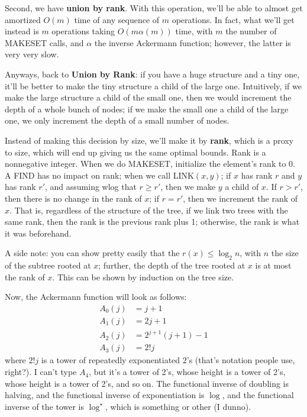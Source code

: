 \documentclass{article}
\begin{document}
Second, we have \textbf{union by rank}.
With this operation, we'll be able to almost get amortized $O(m)$ time of any
sequence of $m$ operations.
In fact, what we'll get instead is $m$ operations taking $O(m\alpha(m))$
time, with $m$ the number of MAKESET calls, and $\alpha$ the inverse 
Ackermann function; however, the latter is very very slow.

Anyways, back to \textbf{Union by Rank}: if you have a huge structure
and a tiny one, it'll be better to make the tiny structure
a child of the large one.
Intuitively, if we make the large structure a child of the small one, then
we would increment the depth of a whole bunch of nodes; if we make the
small one a child of the large one, we only increment the depth of a
small number of nodes.

Instead of making this decision by size, we'll make it by \textbf{rank}, which is a
proxy to size, which will end up giving us the same optimal bounds.
Rank is a nonnegative integer.
When we do MAKESET, initialize the element's rank to 0.
A FIND has no impact on rank;
when we call LINK$(x,y)$; if $x$ has rank $r$ and $y$ has rank $r'$, and 
assuming wlog that $r \geq r'$, then we make $y$ a child of $x$.
If $r > r'$, then there is no change in the rank of $x$; if $r=r'$, then
we increment the rank of $x$.
That is, regardless of the structure of the tree, if we link two trees with
the same rank, then the rank is the previous rank plus 1; otherwise, the
rank is what it was beforehand.

A side note: you can show pretty easily that the $r(x) \leq \log_2 n$, with
$n$ the size of the subtree rooted at $x$; further, the depth of the 
tree rooted at $x$ is at most the rank of $x$.
This can be shown by induction on the tree size.

Now, the Ackermann function will look as follows:
\begin{align}
A_0(j) &= j + 1 \\
A_1(j) &=
	2j + 1 \\
A_2(j) &=
	2^{j+1}(j+1) - 1 \\
A_3(j) &= 2 ! j
\end{align}
where $2 ! j$ is a tower of repeatedly exponentiated $2$'s (that's notation
people use, right?).
I can't type $A_4$, but it's a tower of 2's, whose height is a tower of 2's,
whose height is a tower of 2's, and so on.
The functional inverse of doubling is halving, and the functional
inverse of exponentiation is $\log$, and the functional inverse of the
tower is $\log^\star$, which is something or other (I dunno).
\end{document}
